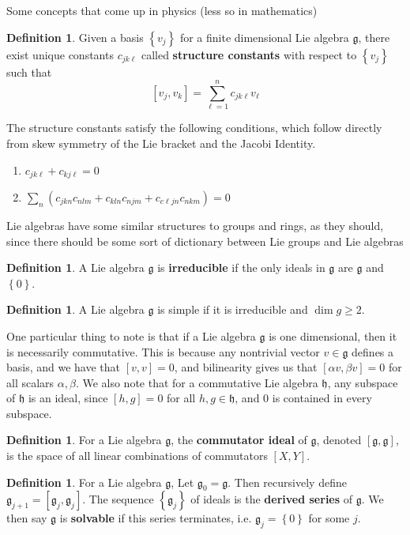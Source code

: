 \documentclass[psamsfonts]{amsart}
\theoremstyle{definition}
\newtheorem{defn}[thm]{Definition}
\theoremstyle{remark}
\newcommand{\g}{\mathfrak{g}}
\newcommand{\bra}[2]{ \left[ #1, #2 \right] }
\newcommand{\set}[1]{\left\lbrace#1 \right\rbrace}
\begin{document}
Some concepts that come up in physics (less so in mathematics)

\begin{defn}
Given a basis $\set{v_j}$ for a finite dimensional Lie algebra $\g$, there exist unique constants $c_{jk\ell}$ called \textbf{structure constants} with respect to $\set{v_j}$ such that 
$$\bra{v_j}{v_k} = \sum\limits_{\ell = 1}^n c_{jk\ell}v_\ell $$
\end{defn}
The structure constants satisfy the following conditions, which follow directly from skew symmetry of the Lie bracket and the Jacobi Identity.
\begin{enumerate}
\item $c_{jk\ell} + c_{kj\ell} = 0$
\item $\sum_n (c_{jkn}c_{nlm} + c_{kln} c_{njm} + c_{c\ell jn}c_{nkm}) = 0$
\end{enumerate}

Lie algebras have some similar structures to groups and rings, as they should, since there should be some sort of dictionary between Lie groups and Lie algebras

\begin{defn}
A Lie algebra $\g$ is \textbf{irreducible} if the only ideals in $\g$ are $\g$ and $\set{0}$.
\end{defn}

\begin{defn}
A Lie algebra $\g$ is simple if it is irreducible and $\dim g \geq 2$.
\end{defn}

One particular thing to note is that if a Lie algebra $\g$ is one dimensional, then it is necessarily commutative. This is because any nontrivial vector $v \in \g$ defines a basis, and we have that $\bra{v}{v} = 0$, and bilinearity gives us that $\bra{\alpha v}{\beta v} = 0$ for all scalars $\alpha, \beta$. We also note that for a commutative Lie algebra $\mathfrak{h}$, any subspace of $\mathfrak{h}$ is an ideal, since $\bra{h}{g} = 0$ for all $h,g \in \mathfrak{h}$, and $0$ is contained in every subspace.

\begin{defn}
For a Lie algebra $\g$, the \textbf{commutator ideal} of $\g$, denoted $\bra{\g}{\g}$, is the space of all linear combinations of commutators $\bra{X}{Y}$.
\end{defn}

\begin{defn}
For a Lie algebra $\g$, Let $\g_0 = \g$. Then recursively define $\g_{j+1} = \bra{\g_j}{\g_j}$.  The sequence $\set{\g_j}$ of ideals is the \textbf{derived series} of $\g$.  We then say $\g$ is \textbf{solvable} if this series terminates, i.e. $\g_j = \set{0}$ for some $j$.
\end{defn}
\end{document}
